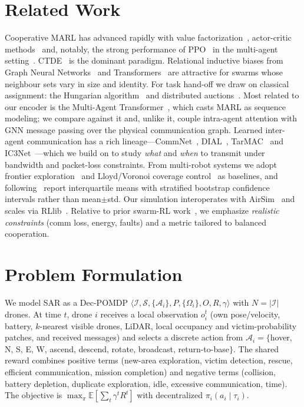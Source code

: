 \documentclass[conference]{IEEEtran}
\begin{document}
\section{Related Work}
Cooperative MARL has advanced rapidly with value factorization~\cite{rashid2018qmix},
actor-critic methods~\cite{lowe2017maddpg,foerster2018coma} and, notably, the
strong performance of PPO~\cite{schulman2017ppo} in the multi-agent
setting~\cite{yu2022mappo}. CTDE~\cite{oliehoek2016decpomdp} is the dominant
paradigm. Relational inductive biases from Graph Neural
Networks~\cite{velickovic2018gat,hamilton2017graphsage} and
Transformers~\cite{vaswani2017attention} are attractive for swarms whose neighbour
sets vary in size and identity. For task hand-off we draw on classical assignment:
the Hungarian algorithm~\cite{kuhn1955hungarian} and distributed
auctions~\cite{bertsekas1988auction}. Most related to our encoder is the Multi-Agent Transformer~\cite{wen2022mat}, which casts MARL as sequence modeling; we compare against it and, unlike it, couple intra-agent attention with GNN message passing over the physical communication graph. Learned inter-agent communication has a rich lineage---CommNet~\cite{sukhbaatar2016commnet}, DIAL~\cite{foerster2016dial}, TarMAC~\cite{das2019tarmac} and IC3Net~\cite{singh2019ic3net}---which we build on to study \emph{what} and \emph{when} to transmit under bandwidth and packet-loss constraints. From multi-robot systems we adopt frontier exploration~\cite{yamauchi1997frontier} and Lloyd/Voronoi coverage control~\cite{cortes2004coverage} as baselines, and following~\cite{agarwal2021rliable} report interquartile means with stratified bootstrap confidence intervals rather than mean$\pm$std. Our simulation interoperates with
AirSim~\cite{shah2018airsim} and scales via RLlib~\cite{liang2018rllib}. Relative
to prior swarm-RL work~\cite{macua2020swarm}, we emphasize \emph{realistic
constraints} (comm loss, energy, faults) and a metric tailored to balanced
cooperation.

\section{Problem Formulation}
We model SAR as a Dec-POMDP $\langle \mathcal{I}, \mathcal{S}, \{\mathcal{A}_i\},
P, \{\Omega_i\}, O, R, \gamma\rangle$ with $N=|\mathcal{I}|$ drones. At time $t$,
drone $i$ receives a local observation $o_i^t$ (own pose/velocity, battery,
$k$-nearest visible drones, LiDAR, local occupancy and victim-probability patches,
and received messages) and selects a discrete action from
$\mathcal{A}_i=\{$hover, N, S, E, W, ascend, descend, rotate, broadcast,
return-to-base$\}$. The shared reward combines positive terms (new-area
exploration, victim detection, rescue, efficient communication, mission
completion) and negative terms (collision, battery depletion, duplicate
exploration, idle, excessive communication, time). The objective is
$\max_{\pi} \mathbb{E}\!\left[\sum_t \gamma^t R^t\right]$ with decentralized
$\pi_i(a_i\mid \tau_i)$.
\end{document}
